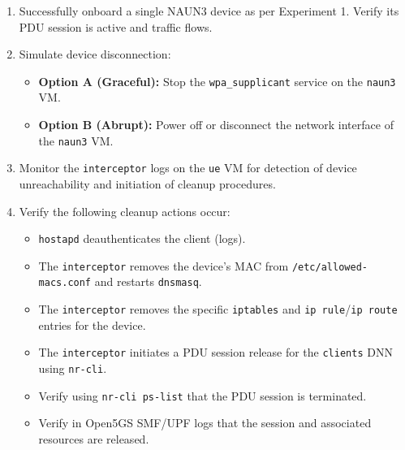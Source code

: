 \begin{enumerate}
    \item Successfully onboard a single \ac{NAUN3} device as per Experiment 1. Verify its \ac{PDU} session is active and traffic flows.

    \item{ Simulate device disconnection:
        \begin{itemize}
            \item \textbf{Option A (Graceful):} Stop the \texttt{wpa\_supplicant} service on the \texttt{naun3} \ac{VM}.
            \item \textbf{Option B (Abrupt):} Power off or disconnect the network interface of the \texttt{naun3} \ac{VM}.
        \end{itemize}
    }

    \item Monitor the \texttt{interceptor} logs on the \texttt{ue} \ac{VM} for detection of device unreachability and initiation of cleanup procedures.

    \item{
        Verify the following cleanup actions occur:
        \begin{itemize}
            \item \texttt{hostapd} deauthenticates the client (logs).

            \item The \texttt{interceptor} removes the device's \ac{MAC} from \texttt{/etc/allowed-macs.conf} and restarts \texttt{dnsmasq}.

            \item The \texttt{interceptor} removes the specific \texttt{iptables} and \texttt{ip rule}/\texttt{ip route} entries for the device.

            \item The \texttt{interceptor} initiates a \ac{PDU} session release for the \texttt{clients} \ac{DNN} using \texttt{nr-cli}.

            \item Verify using \texttt{nr-cli ps-list} that the \ac{PDU} session is terminated.
            
            \item Verify in Open5GS \ac{SMF}/\ac{UPF} logs that the session and associated resources are released.
        \end{itemize}
    }    
\end{enumerate}

